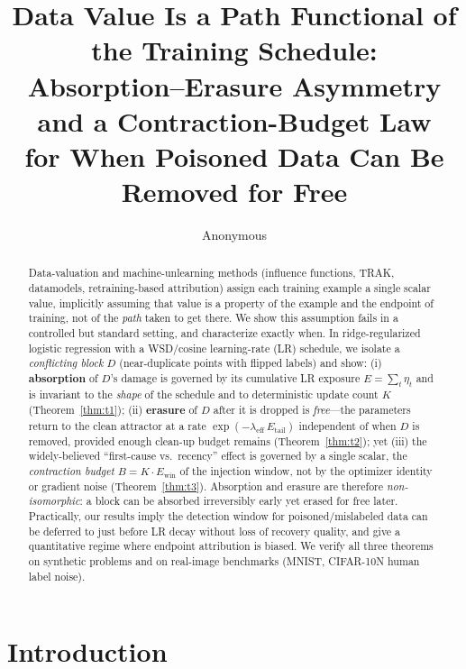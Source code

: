 \documentclass{article}
\title{Data Value Is a Path Functional of the Training Schedule:\\
Absorption--Erasure Asymmetry and a Contraction-Budget Law\\
for When Poisoned Data Can Be Removed for Free}
\author{Anonymous}
\newcommand{\Expo}{E}         %
\newcommand{\Ewin}{E_{\mathrm{win}}}
\newcommand{\B}{B}            %
\newcommand{\lam}{\lambda}
\newcommand{\lameff}{\lam_{\mathrm{eff}}}
\begin{document}
\maketitle

\begin{abstract}
Data-valuation and machine-unlearning methods (influence functions, TRAK, datamodels,
retraining-based attribution) assign each training example a single scalar value, implicitly
assuming that value is a property of the example and the endpoint of training, not of the
\emph{path} taken to get there. We show this assumption fails in a controlled but standard
setting, and characterize exactly when. In ridge-regularized logistic regression with a
WSD/cosine learning-rate (LR) schedule, we isolate a \emph{conflicting block} $D$
(near-duplicate points with flipped labels) and show: (i) \textbf{absorption} of $D$'s damage
is governed by its cumulative LR exposure $\Expo=\sum_t\eta_t$ and is invariant to the
\emph{shape} of the schedule and to deterministic update count $K$ (Theorem~\ref{thm:t1});
(ii) \textbf{erasure} of $D$ after it is dropped is \emph{free}---the parameters return to
the clean attractor at a rate $\exp(-\lameff\,E_{\mathrm{tail}})$ independent of when $D$ is
removed, provided enough clean-up budget remains (Theorem~\ref{thm:t2}); yet (iii) the
widely-believed ``first-cause vs.\ recency'' effect is governed by a single scalar, the
\emph{contraction budget} $\B=K\cdot\Ewin$ of the injection window, not by the optimizer
identity or gradient noise (Theorem~\ref{thm:t3}). Absorption and erasure are therefore
\emph{non-isomorphic}: a block can be absorbed irreversibly early yet erased for free later.
Practically, our results imply the detection window for poisoned/mislabeled data can be
deferred to just before LR decay without loss of recovery quality, and give a quantitative
regime where endpoint attribution is biased. We verify all three theorems on synthetic
problems and on real-image benchmarks (MNIST, CIFAR-10N human label noise).
\end{abstract}

\section{Introduction}
\label{sec:intro}
\end{document}
